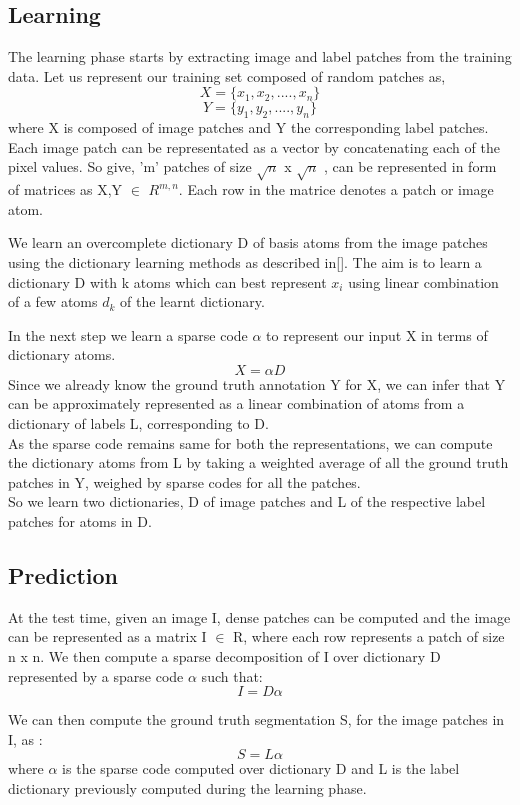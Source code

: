 \subsection{Learning}
The learning phase starts by extracting image and label patches from the training data. Let us represent our training set composed of random patches as,
$$
X = \{x_1,x_2,....,x_n\}
$$
$$
Y = \{y_1,y_2,....,y_n\}
$$
where X is composed of image patches and Y the corresponding label patches. Each image patch can be representated as a vector by concatenating each of the pixel values. So give, 'm' patches of size $\sqrt{n}$ x $\sqrt{n}$ , can be represented in form of matrices as 
X,Y $\in$ $R^{m,n}$. Each row in the matrice denotes a patch or image atom.

We learn an overcomplete dictionary  D of basis atoms from the image patches using the dictionary learning methods as described in[].
The aim is to learn a dictionary D with k atoms which can best represent $x_i$ using linear combination of a few atoms $d_k$ of the learnt dictionary.

In the next step we learn a sparse code $\alpha$ to represent our input X in terms of dictionary atoms.
$$
X = \alpha D
$$ 
Since we already know the ground truth annotation Y for X, we can infer that Y can be approximately represented as a linear combination of atoms from a dictionary of labels L, corresponding to D.\\

As the sparse code remains same for both the representations, we can compute the dictionary atoms from L by taking a weighted average of all the ground truth patches in Y, weighed by sparse codes for all the patches.\\

So we learn two dictionaries, D of image patches and L of the respective label patches for atoms in D.

\subsection{Prediction}
At the test time, given an image I, dense patches can be computed and the image can be represented as a matrix I $\in$ R, where each row represents a patch of size n x n. We then compute a sparse decomposition of I over dictionary D represented by a sparse code $\alpha$ such that:
$$
I = D \alpha
$$

We can then compute the ground truth segmentation S, for the image patches in I, as :
$$
S = L\alpha
$$
where $\alpha$ is the sparse code computed over dictionary D and L is the label dictionary previously computed during the learning phase.

